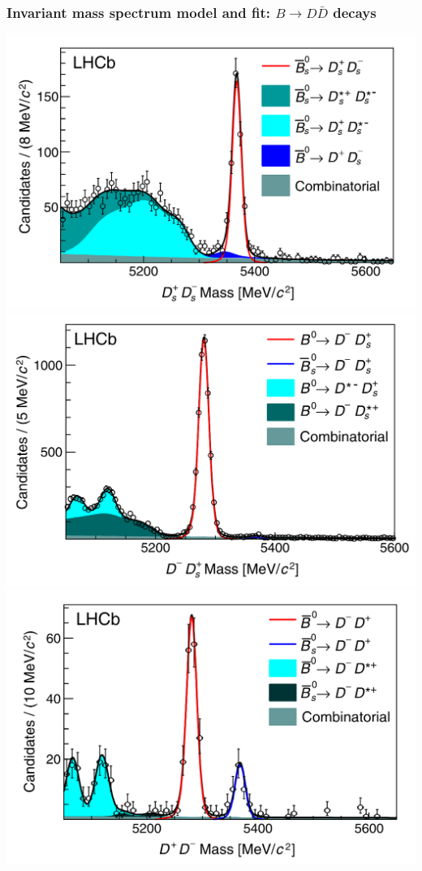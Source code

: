 \documentclass[10pt, aspectratio=169]{beamer}
\begin{document}
\begin{frame}[label=model-B2DD]%
  \frametitle{Invariant mass spectrum model and fit:
  $B\to D\bar{D}$ decays}

  \centering
  \def\localwidth{.32\textwidth}
  \parbox{.66\textwidth}{
    \includegraphics[width=\localwidth]{figures/conf/B2DD-fig002l}
    \includegraphics[width=\localwidth]{figures/conf/B2DD-fig002r}
    \includegraphics[width=\localwidth]{figures/conf/B2DD-fig004l}
}
\end{frame}
\end{document}
